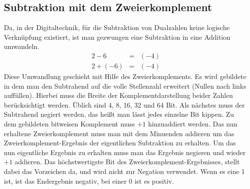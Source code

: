 \documentclass[a4paper,12pt,fleqn,oneside]{article}
\begin{document}
	\subsection{Subtraktion mit dem Zweierkomplement}	
		Da, in der Digitaltechnik, für die Subtraktion von Dualzahlen keine logische Verknüpfung existiert, ist man gezwungen eine 				Subtraktion in eine Addition umwandeln. 
		\[ \begin{array}{rcl}
   				 2 - 6       & = & (-4)			\\
  			         2 + (-6)   & = & (-4)	
		\end{array} \]
		\vspace{\baselineskip}
		Diese Umwandlung geschieht mit Hilfe des Zweierkomplements. Es wird gebildete in dem man den Subtrahend auf die volle 		Stellenzahl erweitert (Nullen nach links auffüllen). Hierbei muss die Breite der Komplementdarstellung beider Zahlen 					berücksichtigt werden. Üblich sind 4, 8, 16, 32 und 64 Bit. Als nächstes muss der Subtrahend negiert werden, das heißt 				man lässt jedes einzelne Bit kippen. Zu dem gebildeten bitweisen Komplement muss $+ 1$ hinzuaddiert werden. Das nun 				erhaltene Zweierkomplement muss man mit dem Minuenden addieren um das Zweierkomplement-Ergebnis der eigentlichen 		Subtraktion zu erhalten. Um das nun eigentliche Ergebnis zu erhalten muss man das Ergebnis negieren und wieder $+ 1$ 				addieren. Das höchstwertigste Bit des Zweierkomplement-Ergebnisses, stellt dabei das Vorzeichen da, und wird nicht zur 				Negation verwendet. Wenn es eine 1 ist, ist das Endergebnis negativ, bei einer 0 ist es positiv. \\
		\\
		
\newpage		
		
\end{document}
